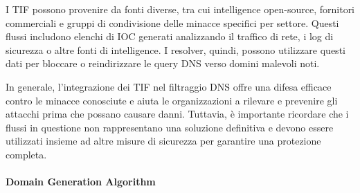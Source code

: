 I TIF possono provenire da fonti diverse, tra cui intelligence open-source, fornitori commerciali e gruppi di condivisione delle minacce specifici per settore. Questi flussi includono elenchi di IOC generati analizzando il traffico di rete, i log di sicurezza o altre fonti di intelligence. I resolver, quindi, possono utilizzare questi dati per bloccare o reindirizzare le query DNS verso domini malevoli noti.

In generale, l'integrazione dei TIF nel filtraggio DNS offre una difesa efficace contro le minacce conosciute e aiuta le organizzazioni a rilevare e prevenire gli attacchi prima che possano causare danni. Tuttavia, è importante ricordare che i flussi in questione non rappresentano una soluzione definitiva e devono essere utilizzati insieme ad altre misure di sicurezza per garantire una protezione completa.

\paragraph{Domain Generation Algorithm}
